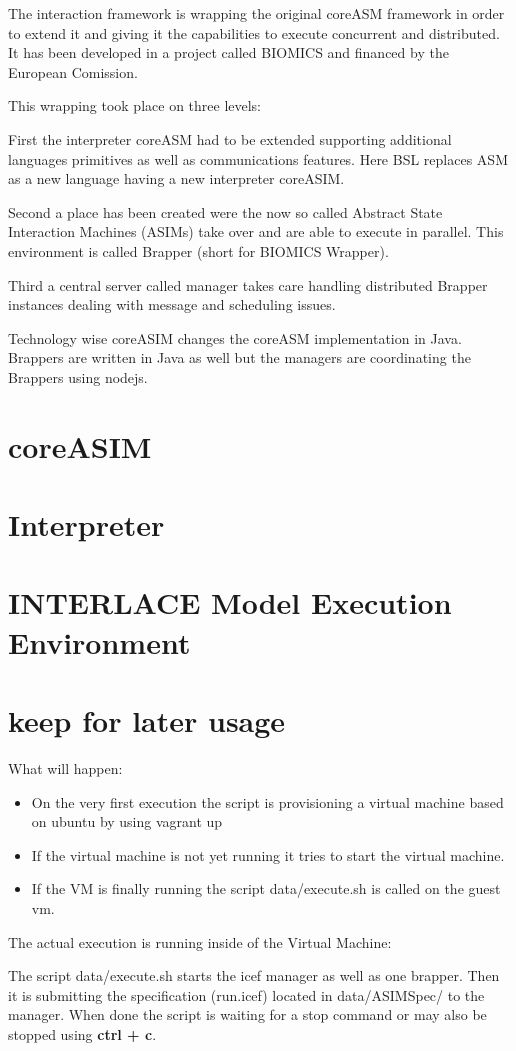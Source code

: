 
The interaction framework is wrapping the original coreASM framework in order to extend it and giving it the capabilities to execute concurrent and distributed. It has been developed in a project called BIOMICS and financed by the European Comission.

This wrapping took place on three levels:

First the interpreter coreASM had to be extended supporting additional languages primitives as well as communications features. Here BSL replaces ASM as a new language having a new interpreter coreASIM.

Second a place has been created were the now so called Abstract State Interaction Machines (ASIMs) take over and are able to execute in parallel. This environment is called Brapper (short for BIOMICS Wrapper).

Third a central server called manager takes care handling distributed Brapper instances dealing with message and scheduling issues.

Technology wise coreASIM changes the coreASM implementation in Java. Brappers are written in Java as well but the managers are coordinating the Brappers using nodejs.

\section{coreASIM}

\section{Interpreter}

\section{INTERLACE Model Execution Environment}
\label{sec:env-exec}

\section{keep for later usage}
What will happen:
\begin{itemize}
	\item On the very first execution the script is provisioning a virtual machine based on ubuntu by using vagrant up
	\item If the virtual machine is not yet running it tries to start the virtual machine.
	\item If the VM is finally running the script data/execute.sh is called on the guest vm.
\end{itemize}

The actual execution is running inside of the Virtual Machine:

The script data/execute.sh starts the icef manager as well as one brapper. Then it is submitting the specification (run.icef) located in data/ASIMSpec/ to the manager. When done the script is waiting for a stop command or may also be stopped using \textbf{ctrl + c}.

